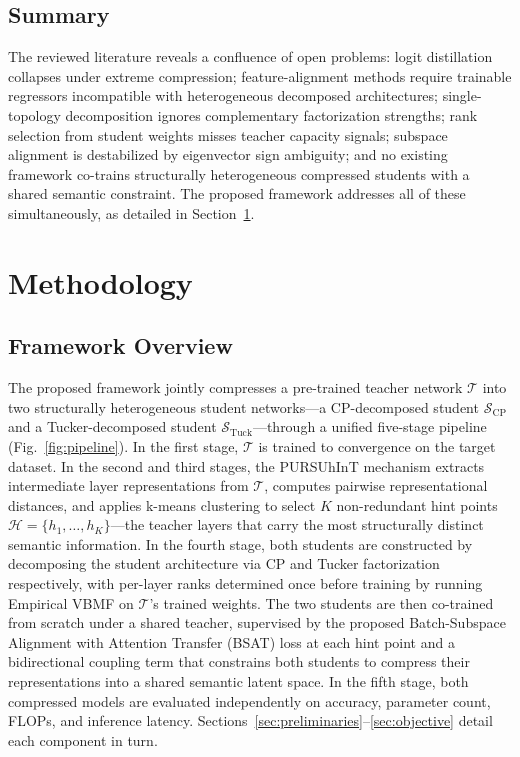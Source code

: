 \documentclass[conference]{IEEEtran}
\begin{document}
\subsection{Summary}
\par
The reviewed literature reveals a confluence of open problems: logit distillation
collapses under extreme compression; feature-alignment methods require trainable
regressors incompatible with heterogeneous decomposed architectures; single-topology
decomposition ignores complementary factorization strengths; rank selection from
student weights misses teacher capacity signals; subspace alignment is destabilized
by eigenvector sign ambiguity; and no existing framework co-trains structurally
heterogeneous compressed students with a shared semantic constraint.
The proposed framework addresses all of these simultaneously, as detailed in Section~\ref{sec:methodology}.










\section{Methodology}
\label{sec:methodology}

\subsection{Framework Overview}
\par
The proposed framework jointly compresses a pre-trained teacher network 
$\mathcal{T}$ into two structurally heterogeneous student networks—a 
CP-decomposed student $\mathcal{S}_{\mathrm{CP}}$ and a Tucker-decomposed 
student $\mathcal{S}_{\mathrm{Tuck}}$—through a unified five-stage pipeline 
(Fig.~\ref{fig:pipeline}). In the first stage, $\mathcal{T}$ is trained to 
convergence on the target dataset. In the second and third stages, the PURSUhInT 
mechanism \cite{keser2023pursuhint} extracts intermediate layer representations 
from $\mathcal{T}$, computes pairwise representational distances, and applies
k-means clustering to select $K$ non-redundant hint points
$\mathcal{H} = \{h_1, \ldots, h_K\}$—the teacher layers that carry the most
structurally distinct semantic information. In the fourth stage, both students
are constructed by decomposing the student architecture via CP and Tucker
factorization respectively, with per-layer ranks determined once before
training by running Empirical VBMF on $\mathcal{T}$'s trained weights. The
two students are then co-trained from scratch under a shared teacher,
supervised by the proposed Batch-Subspace Alignment with Attention Transfer
(BSAT) loss at each hint point and a bidirectional coupling term that
constrains both students to compress their representations into a shared
semantic latent space. In the fifth stage, both compressed models are
evaluated independently on accuracy, parameter count, FLOPs, and inference
latency. Sections~\ref{sec:preliminaries}–\ref{sec:objective} detail each
component in turn.
\end{document}
